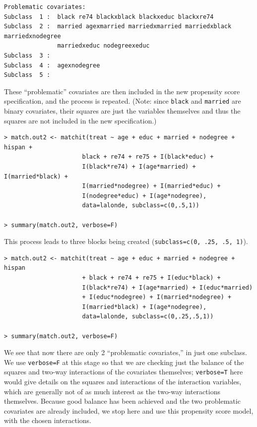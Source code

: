 \documentclass[oneside,letterpaper,titlepage]{article}
\begin{document}
\begin{verbatim}
Problematic covariates:
Subclass  1 :  black re74 blackxblack blackxeduc blackxre74
Subclass  2 :  married agexmarried marriedxmarried marriedxblack marriedxnodegree 
               marriedxeduc nodegreexeduc
Subclass  3 :  
Subclass  4 :  agexnodegree
Subclass  5 :  
\end{verbatim}

These ``problematic'' covariates are then included in the new
propensity score specification, and the process is repeated.  (Note:
since {\tt black} and {\tt married} are binary covariates, their
squares are just the variables themselves and thus the squares are not
included in the new specification.)

\begin{verbatim}
> match.out2 <- matchit(treat ~ age + educ + married + nodegree + hispan +
                      black + re74 + re75 + I(black*educ) +
                      I(black*re74) + I(age*married) + I(married*black) + 
                      I(married*nodegree) + I(married*educ) +
                      I(nodegree*educ) + I(age*nodegree),
                      data=lalonde, subclass=c(0,.5,1))

> summary(match.out2, verbose=F)
\end{verbatim}

This process leads to three blocks being created  ({\tt subclass=c(0, .25, .5, 1)}).

\begin{verbatim}
> match.out2 <- matchit(treat ~ age + educ + married + nodegree + hispan
                      + black + re74 + re75 + I(educ*black) +
                      I(black*re74) + I(age*married) + I(educ*married)
                      + I(educ*nodegree) + I(married*nodegree) +
                      I(married*black) + I(age*nodegree),
                      data=lalonde, subclass=c(0,.25,.5,1))

> summary(match.out2, verbose=F)
\end{verbatim}

We see that now there are only 2 ``problematic covariates,'' in just
one subclass.  We use {\tt verbose=F} at this stage so that we are
checking just the balance of the squares and two-way interactions of
the covariates themselves; {\tt verbose=T} here would give details on
the squares and interactions of the interaction variables, which are
generally not of as much interest as the two-way interactions
themselves.  Because good balance has been achieved and the two
problematic covariates are already included, we stop here and use this
propensity score model, with the chosen interactions.
\end{document}
